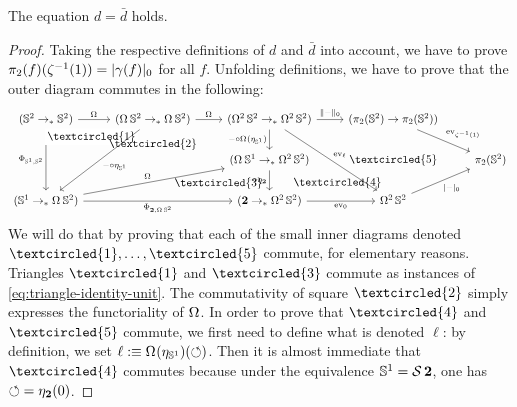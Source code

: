 \documentclass[english,a4]{article}
\newcommand{\ptdto}{\to_\ast}%
\newcommand{\setTrunc}[1]{\Trunc{#1}_0}
\newcommand{\settrunc}[1]{\trunc{#1}_0}
\begin{document}
\begin{proposition}
  The equation $d=\bar d$ holds.
  \label{prop:alternative-description-degree}
\end{proposition}
\begin{proof}
  Taking the respective definitions of $d$ and $\bar d$ into account,
  we have to prove $\pi_2 (f)({\inv\zeta(1)})= \settrunc {\gamma(f)}$ for all $f$.
  Unfolding definitions, 
  we have to prove that the outer diagram commutes in the following:
  \begin{displaymath}
    \begin{tikzcd}
      (\Sp \ptdto \Sp) \ar[r,"\loopspace\null"] \ar[dd,"\Phi_{\Sc,\Sp}"{swap}]
      \drar[phantom,"\textcircled{\small 1}"{description, near start}] 
      & (\loopspace \null \Sp \ptdto \loopspace\null\Sp) \ar[r,"\loopspace\null"] \ar[ddl,"\blank\circ\eta_{\Sc}"] 
      \dar["\textcircled{\small 2}", phantom]
      & (\loopspace 2 \Sp \ptdto \loopspace 2 \Sp) \ar[ddr,"\ev_\ell"] 
      \ar[r,"\setTrunc\blank"] \dar["\blank\circ \loopspace\null(\eta_{\Sc})"swap] 
      & (\pi_2(\Sp) \to \pi_2(\Sp)) \drar["\ev_{\inv\zeta(1)}"] \ar[dd,"\textcircled{\small 5}", phantom] &
      \\
      & {} \drar["\textcircled{\small 3}"{near end}, phantom] 
      & (\loopspace\null\Sc \ptdto \loopspace 2 \Sp) \dar["\blank\circ\eta_{\bn 2}"swap] 
      \drar["\textcircled{\small 4}", phantom] &
      & \pi_2(\Sp)
      \\
      (\Sc \ptdto \loopspace\null\Sp) \ar[rr,"\Phi_{\bn 2,\loopspace\null\Sp}"swap] \ar[urr,"\loopspace\null"] & 
      & (\bn 2 \ptdto \loopspace 2 \Sp) \rar["\ev_0"swap] & \loopspace 2 \Sp \urar["\settrunc\blank"swap] & 
    \end{tikzcd}
  \end{displaymath}
  We will do that by proving that each of the small inner diagrams denoted
  $\textcircled{\small 1},\dots,\textcircled{\small 5}$ commute, for
  elementary reasons. Triangles $\textcircled{\small 1}$ and
  $\textcircled{\small 3}$ commute as instances of
  \cref{eq:triangle-identity-unit}. The commutativity of square
  $\textcircled{\small 2}$ simply expresses the functoriality of
  $\loopspace\null$. In order to prove that $\textcircled{\small 4}$ and
  $\textcircled{\small 5}$ commute, we first need to define what is denoted
  $\ell$: by definition, we set $\ell \defequi \loopspace\null (\eta_\Sc)(\Sloop)$.
  Then it is almost immediate that $\textcircled{\small 4}$ commutes because
  under the equivalence ${{\mathbb S^{1}}} = \operatorname{\mathcal S} {\mathbf{2}}$, one has $\mathord{\circlearrowleft} = \eta_{\mathbf{2}}(0)$.

\end{proof}
\end{document}
